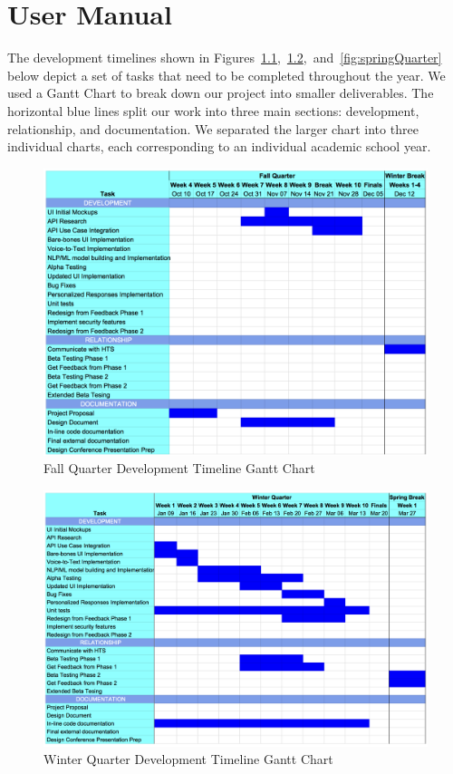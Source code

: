 \chapter{User Manual}
The development timelines shown in Figures~\ref{fig:fallQuarter},~\ref{fig:winterQuarter},~and~\ref{fig:springQuarter} below depict a set of tasks that need to be completed throughout the year. We used a Gantt Chart to break down our project into smaller deliverables. The horizontal blue lines split our work into three main sections: development, relationship, and documentation. We separated the larger chart into three individual charts, each corresponding to an individual academic school year.

\begin{figure}[htb]
\centering
\includegraphics[width =\textwidth]{fallQuarter.png}
\caption{Fall Quarter Development Timeline Gantt Chart}
\label{fig:fallQuarter}
\end{figure}

\begin{figure}[htb]
\centering
\includegraphics[width =\textwidth]{winterQuarter.png}
\caption{Winter Quarter Development Timeline Gantt Chart}
\label{fig:winterQuarter}
\end{figure}

